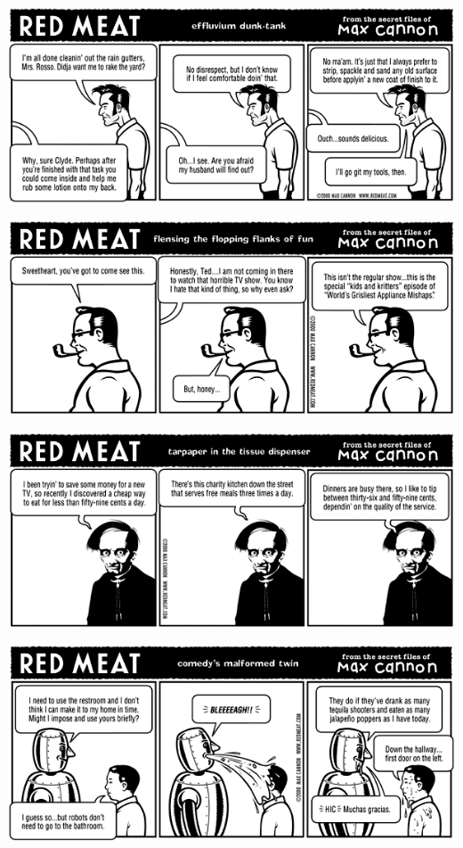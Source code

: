 \documentclass[a4paper,twoside,11pt]{article}
\begin{document}
\includegraphics[width=\textwidth]{redmeat_2000-05-09.png}



\includegraphics[width=\textwidth]{redmeat_2000-05-16.png}



\includegraphics[width=\textwidth]{redmeat_2000-05-23.png}



\includegraphics[width=\textwidth]{redmeat_2000-05-30.png}
\end{document}
